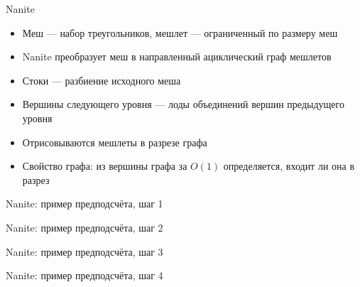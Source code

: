 \begin{frame}{Nanite}
    \begin{itemize}
        \item Меш --- набор треугольников, мешлет --- ограниченный по размеру меш
        \item Nanite преобразует меш в направленный ациклический граф мешлетов
        \item Стоки --- разбиение исходного меша
        \item Вершины следующего уровня --- лоды объединений вершин предыдущего уровня
        \item Отрисовываются мешлеты в разрезе графа
        \item Свойство графа: из вершины графа за $O(1)$ определяется, входит ли она в разрез
    \end{itemize}
    \begin{center}
        
        
    \end{center}
\end{frame}

\begin{frame}{Nanite: пример предподсчёта, шаг 1}
    \centering 
\end{frame}

\begin{frame}{Nanite: пример предподсчёта, шаг 2}
    \centering 
\end{frame}

\begin{frame}{Nanite: пример предподсчёта, шаг 3}
    \centering 
\end{frame}

\begin{frame}{Nanite: пример предподсчёта, шаг 4}
    \centering 
\end{frame}
